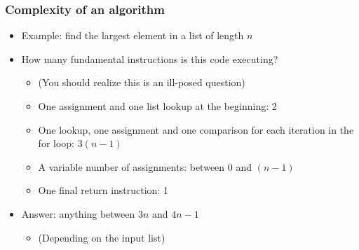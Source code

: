 \documentclass[9pt]{beamer}
\begin{document}
\begin{frame}
  \frametitle{Complexity of an algorithm}
  

  \begin{itemize}
  \item Example: find the largest element in a list of length $n$
  \item How many fundamental instructions is this code executing?
    \begin{itemize}
    \item \alert{(You should realize this is an ill-posed question)}
    \item One assignment and one list lookup at the beginning: $2$
    \item One lookup, one assignment and one comparison for each iteration
      in the for loop: $3(n - 1)$
    \item A variable number of assignments: between $0$ and $(n - 1)$
    \item One final return instruction: 1
    \end{itemize}
  \item \alert{Answer: anything between $3n$ and $4n - 1$}
    \begin{itemize}
    \item (Depending on the input list)
    \end{itemize}
  \end{itemize}
\end{frame}
\end{document}
